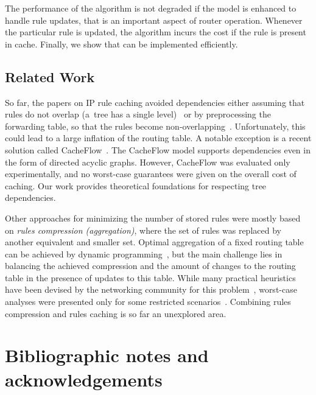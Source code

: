 The performance of the algorithm is not degraded if the model is enhanced to handle rule updates, that is an important aspect of router operation.
Whenever the particular rule is updated, the algorithm incurs the cost if the rule is present in cache.
Finally, we show that \ALG can be implemented efficiently.

\subsection{Related Work}

So far, the papers on IP rule caching avoided dependencies either assuming
that rules do not overlap (a~tree has a single level)~\cite{route-caching-flat} 
or by preprocessing the forwarding table, so that the rules become
non-overlapping~\cite{prefix-caching,fib-caching-non-overlapping}.
Unfortunately, this could lead to a large inflation of the routing table. A
notable exception is a recent solution called CacheFlow~\cite{cacheflow}. The
CacheFlow model supports dependencies even in the form of directed acyclic
graphs. However, CacheFlow was evaluated only experimentally, and no
worst-case guarantees were given on the overall cost of caching. Our work
provides theoretical foundations for respecting tree dependencies.


Other approaches for minimizing the number of stored rules were mostly based
on \emph{rules compression (aggregation)}, where the set of rules was replaced
by another equivalent and smaller set. Optimal aggregation of a fixed routing
table can be achieved by dynamic
programming~\cite{ortc,fib-compression-two-dimensional}, but the main
challenge lies in balancing the achieved compression and the amount of changes
to the routing table in the presence of updates to this table. While
many practical heuristics have been devised by the networking community for
this problem~\cite{mms,fib-compression-fifa,fib-compression-globecom10,fib-compression-infocom13,fib-sigcomm,fib-compression-smalta,fib-compression-infocom10},
worst-case analyses were presented only for some restricted
scenarios~\cite{fib-icdcs,fib-sirocco}. Combining rules compression and rules
caching is so far an unexplored area.



\section{Bibliographic notes and acknowledgements}

